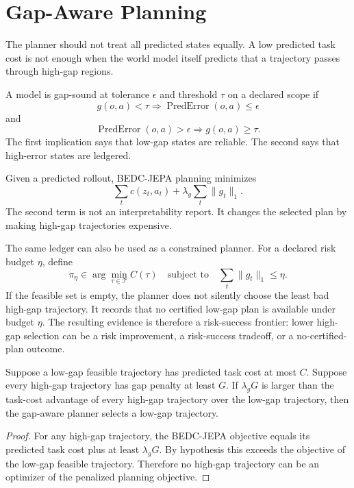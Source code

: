 \section{Gap-Aware Planning}
\label{sec:gap-aware-planning}

The planner should not treat all predicted states equally.  A low predicted
task cost is not enough when the world model itself predicts that a trajectory
passes through high-gap regions.

\begin{definition}
A model is gap-sound at tolerance $\epsilon$ and threshold $\tau$ on a declared
scope if
$$
  g(o,a)<\tau \Rightarrow \operatorname{PredError}(o,a)\le\epsilon
$$
and
$$
  \operatorname{PredError}(o,a)>\epsilon \Rightarrow g(o,a)\ge\tau .
$$
The first implication says that low-gap states are reliable.  The second says
that high-error states are ledgered.
\end{definition}

Given a predicted rollout, BEDC-JEPA planning minimizes
$$
  \sum_t c(z_t,a_t)+\lambda_g\sum_t \lVert g_t\rVert_1 .
$$
The second term is not an interpretability report.  It changes the selected
plan by making high-gap trajectories expensive.

The same ledger can also be used as a constrained planner.  For a declared
risk budget $\eta$, define
$$
  \pi_\eta
  \in
  \arg\min_{\tau\in\mathcal T} C(\tau)
  \quad\text{subject to}\quad
  \sum_t \lVert g_t\rVert_1 \le \eta .
$$
If the feasible set is empty, the planner does not silently choose the least
bad high-gap trajectory.  It records that no certified low-gap plan is
available under budget $\eta$.  The resulting evidence is therefore a
risk-success frontier: lower high-gap selection can be a risk improvement, a
risk-success tradeoff, or a no-certified-plan outcome.

\begin{proposition}
Suppose a low-gap feasible trajectory has predicted task cost at most $C$.
Suppose every high-gap trajectory has gap penalty at least $G$.  If
$\lambda_g G$ is larger than the task-cost advantage of every high-gap
trajectory over the low-gap trajectory, then the gap-aware planner selects a
low-gap trajectory.
\end{proposition}

\begin{proof}
For any high-gap trajectory, the BEDC-JEPA objective equals its predicted task
cost plus at least $\lambda_g G$.  By hypothesis this exceeds the objective of
the low-gap feasible trajectory.  Therefore no high-gap trajectory can be an
optimizer of the penalized planning objective.
\end{proof}

